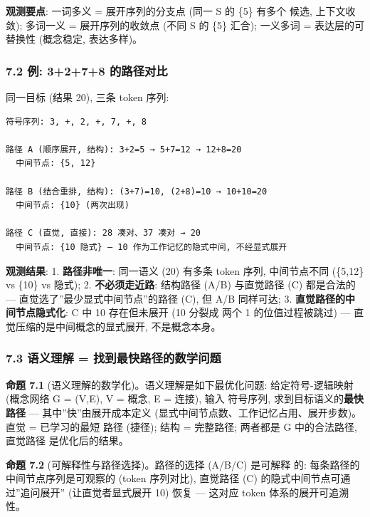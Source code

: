 \documentclass[
]{article}
\begin{document}
\textbf{观测要点}: 一词多义 = 展开序列的分支点 (同一 S 的 \{5\} 有多个
候选, 上下文收敛); 多词一义 = 展开序列的收敛点 (不同 S 的 \{5\} 汇合);
一义多词 = 表达层的可替换性 (概念稳定, 表达多样)。

\subsubsection{7.2 例: 3+2+7+8
的路径对比}\label{ux4f8b-3278-ux7684ux8defux5f84ux5bf9ux6bd4}

同一目标 (结果 20), 三条 token 序列:

\begin{verbatim}
符号序列: 3, +, 2, +, 7, +, 8

路径 A (顺序展开, 结构): 3+2=5 → 5+7=12 → 12+8=20
  中间节点: {5, 12}

路径 B (结合重排, 结构): (3+7)=10, (2+8)=10 → 10+10=20
  中间节点: {10} (两次出现)

路径 C (直觉, 直接): 28 凑对、37 凑对 → 20
  中间节点: {10 隐式} — 10 作为工作记忆的隐式中间, 不经显式展开
\end{verbatim}

\textbf{观测结果}: 1. \textbf{路径非唯一}: 同一语义 (20) 有多条 token
序列, 中间节点不同 (\{5,12\} vs \{10\} vs 隐式); 2.
\textbf{不必须走近路}: 结构路径 (A/B) 与直觉路径 (C) 都是合法的 ---
直觉选了''最少显式中间节点''的路径 (C), 但 A/B 同样可达; 3.
\textbf{直觉路径的中间节点隐式化}: C 中 10 存在但未展开 (10 分裂成 两个
1 的位值过程被跳过) --- 直觉压缩的是中间概念的显式展开, 不是概念本身。

\subsubsection{7.3 语义理解 =
找到最快路径的数学问题}\label{ux8bedux4e49ux7406ux89e3-ux627eux5230ux6700ux5febux8defux5f84ux7684ux6570ux5b66ux95eeux9898}

\textbf{命题 7.1} (语义理解的数学化)。语义理解是如下最优化问题:
给定符号-逻辑映射 (概念网络 G = (V,E), V = 概念, E = 连接), 输入
符号序列, 求到目标语义的\textbf{最快路径} --- 其中''快''由展开成本定义
(显式中间节点数、工作记忆占用、展开步数)。直觉 = 已学习的最短 路径
(捷径); 结构 = 完整路径; 两者都是 G 中的合法路径, 直觉路径
是优化后的结果。

\textbf{命题 7.2} (可解释性与路径选择)。路径的选择 (A/B/C) 是可解释 的:
每条路径的中间节点序列是可观察的 (token 序列对比), 直觉路径 (C)
的隐式中间节点可通过''追问展开'' (让直觉者显式展开 10) 恢复 --- 这对应
token 体系的展开可追溯性。
\end{document}
